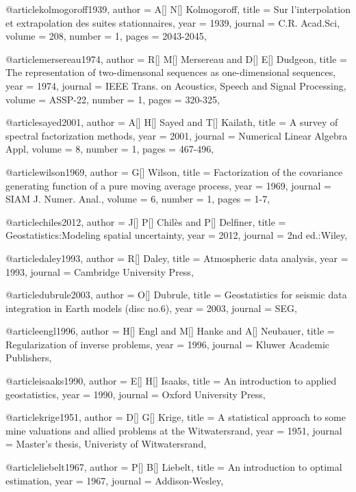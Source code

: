 {@article{kolmogoroff1939,
  author =	 {A[] N[] Kolmogoroff},
  title =	 {Sur l'interpolation et extrapolation des suites stationnaires},
  year =	 1939,
  journal =	 {C.R. Acad.Sci},
  volume =	 208,
  number =	 1,
  pages =	 {2043-2045},
}

@article{mersereau1974,
  author =	 {R[] M[] Mersereau and D[] E[] Dudgeon},
  title =	 {The representation of two-dimensonal sequences as one-dimensional sequences},
  year =	 1974,
  journal =	 {IEEE Trans. on Acoustics, Speech and Signal Processing},
  volume =	 ASSP-22,
  number =	 1,
  pages =	 {320-325},
}

@article{sayed2001,
  author =	 {A[] H[] Sayed and T[] Kailath},
  title =	 {A survey of spectral factorization methods},
  year =	 2001,
  journal =	 {Numerical Linear Algebra Appl},
  volume =	 8,
  number =	 1,
  pages =	 {467-496},
}

@article{wilson1969,
  author =	 {G[] Wilson},
  title =	 {Factorization of the covariance generating function of a pure moving average process},
  year =	 1969,
  journal =	 {SIAM J. Numer. Anal.},
  volume =	 6,
  number =	 1,
  pages =	 {1-7},
}

@article{chiles2012,
  author =	 {J[] P[] Chil\`{e}s and P[] Delfiner},
  title =	 {Geostatistics:Modeling spatial uncertainty},
  year =	 2012,
  journal =	 {2nd ed.:Wiley},
}

@article{daley1993,
  author =	 {R[] Daley},
  title =	 {Atmospheric data analysis},
  year =	 1993,
  journal =	 {Cambridge University Press},
}

@article{dubrule2003,
  author =	 {O[] Dubrule},
  title =	 {Geostatistics for seismic data integration in Earth models (disc no.6)},
  year =	 2003,
  journal =	 {SEG},
}

@article{engl1996,
  author =	 {H[] Engl and M[] Hanke and A[] Neubauer},
  title =	 {Regularization of inverse problems},
  year =	 1996,
  journal =	 {Kluwer Academic Publishers},
}

@article{isaaks1990,
  author =	 {E[] H[] Isaaks},
  title =	 {An introduction to applied geostatistics},
  year =	 1990,
  journal =	 {Oxford University Press},
}

@article{krige1951,
  author =	 {D[] G[] Krige},
  title =	 {A statistical approach to some mine valuations and allied problems at the Witwatersrand},
  year =	 1951,
  journal =	 {Master's thesis, Univeristy of Witwatersrand},
}

@article{liebelt1967,
  author =	 {P[] B[] Liebelt},
  title =	 {An introduction to optimal estimation},
  year =	 1967,
  journal =	 {Addison-Wesley},
}

}
